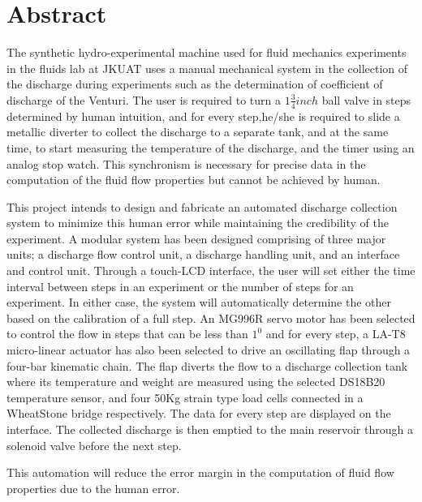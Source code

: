 \section*{Abstract}
\label{sec:}
\par
The synthetic hydro-experimental machine used for fluid mechanics experiments in the fluids lab at JKUAT uses a manual mechanical system in the collection of the discharge during experiments such as the determination of coefficient of discharge of the Venturi. The user is required to turn a $1\frac{3}{4} inch $ ball valve in steps determined by human intuition, and for every step,he/she is required to slide a metallic diverter to collect the discharge to a separate tank, and at the same time, to start measuring the temperature of the discharge, and the timer using an analog stop watch. This synchronism is necessary for precise data in the computation of the fluid flow properties but cannot be achieved by human. 
\par
This project intends to design and fabricate an automated discharge collection system to minimize this human error while maintaining the credibility of the experiment. A modular system has been designed comprising of three major units; a discharge flow control unit, a discharge handling unit, and an interface and control unit. Through a touch-LCD interface, the user will set either the time interval between steps in an experiment or the number of steps for an experiment. In either case, the system will automatically determine the other based on the calibration of a full step. An MG996R servo motor has been selected to control the flow in steps that can be less than $1^{0}$ and for every step, a LA-T8 micro-linear actuator has also been selected to drive an oscillating flap through a four-bar kinematic chain. The flap diverts the flow to a discharge collection tank where its temperature and weight are measured using the selected DS18B20 temperature sensor, and four 50Kg strain type load cells connected in a WheatStone bridge respectively. The data for every step are displayed on the interface. The collected discharge is then emptied to the main reservoir through a solenoid valve before the next step.

\par
This automation will reduce the error margin in the computation of fluid flow properties due to the human error.